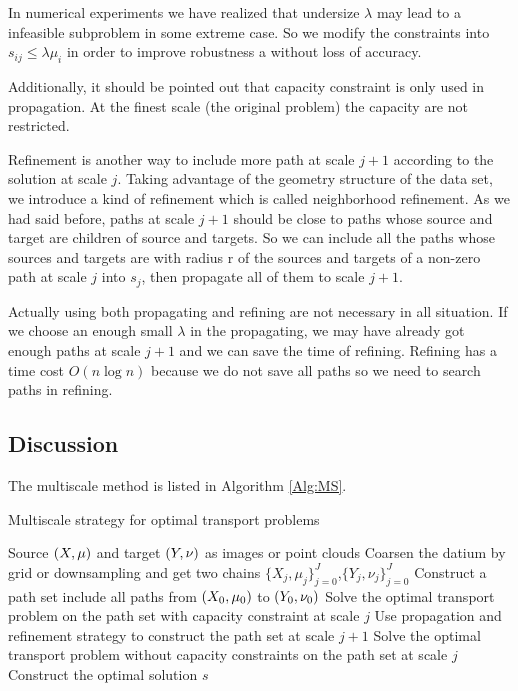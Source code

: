\documentclass[english]{pkupaper}
\begin{document}
In numerical experiments we have realized that undersize $\lambda$ may lead to a infeasible subproblem in some extreme case. So we modify the constraints into $s_{ij}\leq\lambda\mu_i$ in order to improve robustness a without loss of accuracy.

Additionally, it should be pointed out that capacity constraint is only used in propagation. At the finest scale (the original problem) the capacity are not restricted.

Refinement is another way to include more path at scale $j+1$ according to the solution at scale $j$. Taking advantage of the geometry structure of the data set, we introduce a kind of refinement which is called neighborhood refinement. As we had said before, paths at scale $j+1$ should be close to paths whose source and target are children of source and targets. So we can include all the paths whose sources and targets are with radius r of the sources and targets of a non-zero path at scale $j$ into $s_j$, then propagate all of them to scale $j+1$.

Actually using both propagating and refining are not necessary in all situation. If we choose an enough small $\lambda$ in the propagating, we may have already got enough paths at scale $j+1$ and we can save the time of refining. Refining has a time cost $O(n \log n)$ because we do not save all paths so we need to search paths in refining.

\subsection{Discussion}

The multiscale method is listed in Algorithm \ref{Alg:MS}.

\begin{algorithm}
\caption{Multiscale strategy for optimal transport problems} \label{Alg:MS}
\begin{algorithmic}
\REQUIRE Source $ \left(  X, \mu  \right) $ and target $ \left(  Y, \nu  \right) $ as images or point clouds
\STATE Coarsen the datium by grid or downsampling and get two chains $\{ X_j, \mu_j \}^J_{j=0}$,$\{Y_j, \nu_j\}^J_{j=0}$
\STATE Construct a path set include all paths from $\left( X_0, \mu_0 \right)$ to $\left( Y_0, \nu_0 \right)$
\STATE Solve the optimal transport problem on the path set with capacity constraint at scale $j$
\STATE Use propagation and refinement strategy to construct the path set at scale $j + 1$
\ENDFOR
\STATE Solve the optimal transport problem without capacity constraints on the path set at scale $j$
\STATE Construct the optimal solution $s$
\end{algorithmic}
\end{algorithm}
\end{document}
